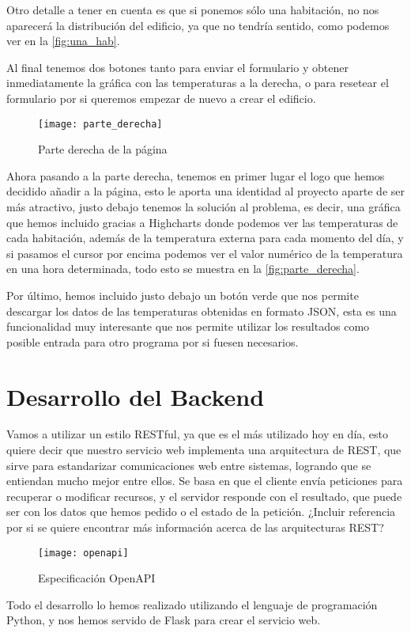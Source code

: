 Otro detalle a tener en cuenta es que si ponemos sólo una habitación, no nos aparecerá la distribución del edificio, ya que no tendría sentido, como podemos ver en la \autoref{fig:una_hab}.

Al final tenemos dos botones tanto para enviar el formulario y obtener inmediatamente la gráfica con las temperaturas a la derecha, o para resetear el formulario por si queremos empezar de nuevo a crear el edificio.
\begin{figure}[h!]
	\centering
	\texttt{[image: parte\_derecha]}
	\caption{Parte derecha de la página}
	\label{fig:parte_derecha}
\end{figure}
Ahora pasando a la parte derecha, tenemos en primer lugar el logo que hemos decidido añadir a la página, esto le aporta una identidad al proyecto aparte de ser más atractivo, justo debajo tenemos la solución al problema, es decir, una gráfica que hemos incluido gracias a Highcharts donde podemos ver las temperaturas de cada habitación, además de la temperatura externa para cada momento del día, y si pasamos el cursor por encima podemos ver el valor numérico de la temperatura en una hora determinada, todo esto se muestra en la \autoref{fig:parte_derecha}.

Por último, hemos incluido justo debajo un botón verde que nos permite descargar los datos de las temperaturas obtenidas en formato JSON, esta es una funcionalidad muy interesante que nos permite utilizar los resultados como posible entrada para otro programa por si fuesen necesarios.

\section{Desarrollo del Backend}
Vamos a utilizar un estilo RESTful, ya que es el más utilizado hoy en día, esto quiere decir que nuestro servicio web implementa una arquitectura de REST, que sirve para estandarizar comunicaciones web entre sistemas, logrando que se entiendan mucho mejor entre ellos. Se basa en que el cliente envía peticiones para recuperar o modificar recursos, y el servidor responde con el resultado, que puede ser con los datos que hemos pedido o el estado de la petición. ¿Incluir referencia por si se quiere encontrar más información acerca de las arquitecturas REST?
\begin{figure}[h!]
	\centering
	\texttt{[image: openapi]}
	\caption{Especificación OpenAPI}
	\label{fig:openapi}
\end{figure}
Todo el desarrollo lo hemos realizado utilizando el lenguaje de programación Python, y nos hemos servido de Flask para crear el servicio web.

